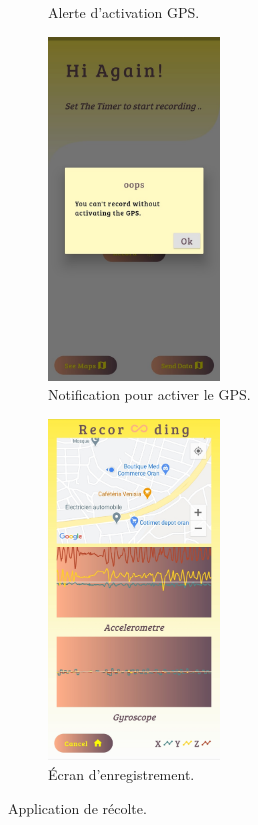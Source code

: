 \begin{figure}[h!]
\begin{subfigure}{.50\textwidth}
        \caption{Alerte d'activation GPS.}
        \label{fig:GpsAcivate}
    \end{subfigure}
    \begin{subfigure}{.50\textwidth}
        \center
        \includegraphics[width=0.50\textwidth]{Images/recordingApp/noGpsAlert.jpg}
        \caption{Notification pour activer le GPS.}
        \label{fig:gpsNotif}
    \end{subfigure}
    \begin{subfigure}{.50\textwidth}
        \center
        \includegraphics[width=0.50\textwidth]{Images/recordingApp/recordingScreen.jpg}
        \caption{Écran d'enregistrement.}
        \label{fig:Recording}
    \end{subfigure}
    \caption{Application de récolte.}
    \label{fig:app_recolte}
\end{figure}

